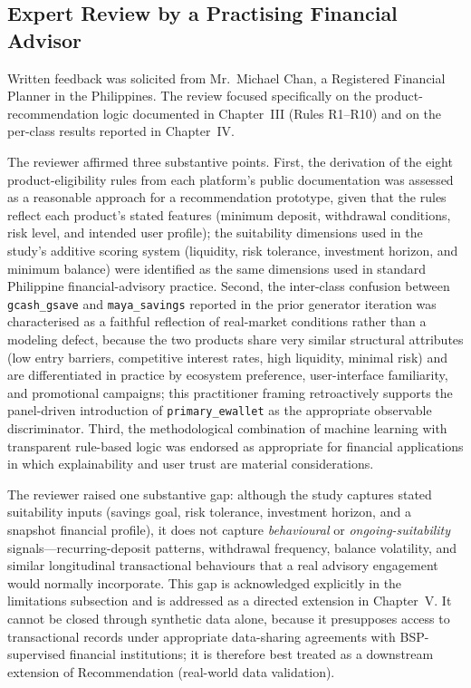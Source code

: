\documentclass[journal]{./IEEE/IEEEtran}
\begin{document}
\subsection{Expert Review by a Practising Financial Advisor}

Written feedback was solicited from Mr.\ Michael Chan, a Registered Financial Planner in the Philippines. The review focused specifically on the product-recommendation logic documented in Chapter~III (Rules R1--R10) and on the per-class results reported in Chapter~IV.

The reviewer affirmed three substantive points. First, the derivation of the eight product-eligibility rules from each platform's public documentation was assessed as a reasonable approach for a recommendation prototype, given that the rules reflect each product's stated features (minimum deposit, withdrawal conditions, risk level, and intended user profile); the suitability dimensions used in the study's additive scoring system (liquidity, risk tolerance, investment horizon, and minimum balance) were identified as the same dimensions used in standard Philippine financial-advisory practice. Second, the inter-class confusion between \texttt{gcash\_gsave} and \texttt{maya\_savings} reported in the prior generator iteration was characterised as a faithful reflection of real-market conditions rather than a modeling defect, because the two products share very similar structural attributes (low entry barriers, competitive interest rates, high liquidity, minimal risk) and are differentiated in practice by ecosystem preference, user-interface familiarity, and promotional campaigns; this practitioner framing retroactively supports the panel-driven introduction of \texttt{primary\_ewallet} as the appropriate observable discriminator. Third, the methodological combination of machine learning with transparent rule-based logic was endorsed as appropriate for financial applications in which explainability and user trust are material considerations.

The reviewer raised one substantive gap: although the study captures stated suitability inputs (savings goal, risk tolerance, investment horizon, and a snapshot financial profile), it does not capture \emph{behavioural} or \emph{ongoing-suitability} signals---recurring-deposit patterns, withdrawal frequency, balance volatility, and similar longitudinal transactional behaviours that a real advisory engagement would normally incorporate. This gap is acknowledged explicitly in the limitations subsection and is addressed as a directed extension in Chapter~V. It cannot be closed through synthetic data alone, because it presupposes access to transactional records under appropriate data-sharing agreements with BSP-supervised financial institutions; it is therefore best treated as a downstream extension of Recommendation (real-world data validation).
\end{document}
